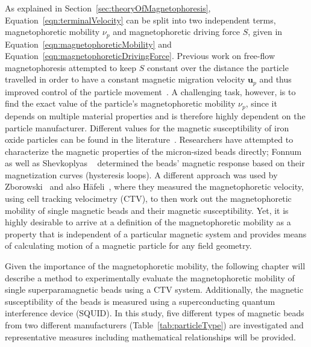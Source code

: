 As explained in Section~\ref{sec:theoryOfMagnetophoresis}, Equation~\ref{eqn:terminalVelocity} can be split into two independent terms, magnetophoretic mobility $\nu_{p}$ and magnetophoretic driving force $S$, given in Equation~\ref{eqn:magnetophoreticMobility} and Equation~\ref{eqn:magnetophoreticDrivingForce}. Previous work on free-flow magnetophoresis attempted to keep $S$ constant over the distance the particle travelled in order to have a constant magnetic migration velocity $\mathbf{u}_{p}$ and thus improved control of the particle movement~\cite{Zborowski1999,Zborowski2002,Derks2010}. A challenging task, however, is to find the exact value of the particle's magnetophoretic mobility $\nu_{p}$, since it depends on multiple material properties and is therefore highly dependent on the particle manufacturer. Different values for the magnetic susceptibility of iron oxide particles can be found in the literature~\cite{Clark1991,Hunt1995,Gupta2005}. Researchers have attempted to characterize the magnetic properties of the micron-sized beads directly; Fonnum \etal~\cite{Fonnum2005} as well as Shevkoplyas \etal~\cite{Shevkoplyas2007} determined the beads' magnetic response based on their magnetization curves (hysteresis loops). A different approach was used by Zborowski~\cite{Zborowski2002} and also H\"afeli~\cite{Haefeli2005}, where they measured the magnetophoretic velocity, using cell tracking velocimetry (CTV), to then work out the magnetophoretic mobility of single magnetic beads and their magnetic susceptibility. Yet, it is highly desirable to arrive at a definition of the magnetophoretic mobility as a property that is independent of a particular magnetic system and provides means of calculating motion of a magnetic particle for any field geometry.

Given the importance of the magnetophoretic mobility, the following chapter will describe a method to experimentally evaluate the magnetophoretic mobility of single superparamagnetic beads using a CTV system. Additionally, the magnetic susceptibility of the beads is measured using a superconducting quantum interference device (SQUID). In this study, five different types of magnetic beads from two different manufacturers (Table~\ref{tab:particleType}) are investigated and representative measures including mathematical relationships will be provided.

